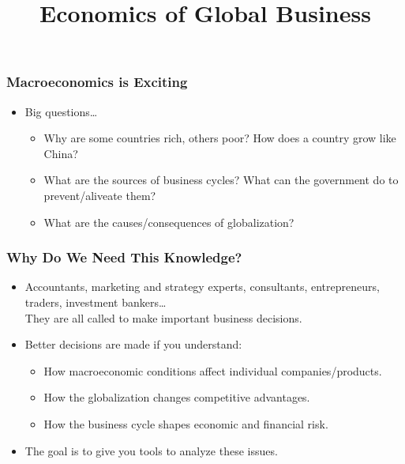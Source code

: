 \documentclass[9pt]{beamer}
\title[NYU Stern] %
{\Large Economics of Global Business}
\date[] %
\begin{document}
\begin{frame}
  \titlepage
\end{frame}

\begin{frame}[t]
\frametitle{Macroeconomics is Exciting}
\bigskip
\begin{itemize}
\item Big questions\ldots
\begin{itemize}
\medskip
\item Why are some countries rich, others poor? How does a country grow like China?
\medskip
\item What are the sources of business cycles? What can the government do to prevent/aliveate them?
\medskip
\item What are the causes/consequences of globalization?
\end{itemize}
\end{itemize}
\bigskip
\end{frame}


\begin{frame}[t]
\frametitle{Why Do We Need This Knowledge?}
\begin{itemize}
\item Accountants, marketing and strategy experts, consultants, entrepreneurs, traders, investment bankers\ldots\\
    \smallskip
    They are all called to make important business decisions.
\bigskip
\item Better decisions are made if you understand:
\begin{itemize}
\medskip
\item How macroeconomic conditions affect individual companies/products.
\medskip
\item How the globalization changes competitive advantages.
\medskip
\item How the business cycle shapes economic and financial risk.
\end{itemize}
\bigskip
\item The goal is to give you tools to analyze these issues. \\
\medskip
\end{itemize}
\end{frame}
\end{document}
